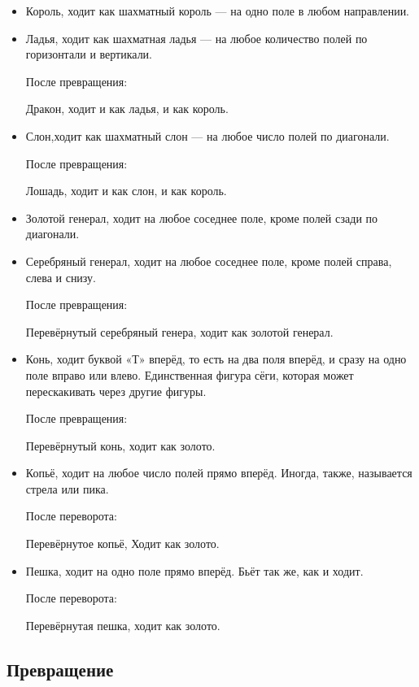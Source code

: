 \begin{itemize}
	\item Король, 
	 ходит как шахматный король — на одно поле в любом направлении.
	 
	\item Ладья, ходит как шахматная ладья — на любое количество полей по горизонтали и 	     вертикали.

	 После превращения:

     Дракон, ходит и как ладья, и как король.

	\item Слон,ходит как шахматный слон — на любое число полей по диагонали.

	 После превращения:

	 Лошадь, ходит и как слон, и как король.

	\item Золотой генерал, ходит на любое соседнее поле, кроме полей сзади по диагонали.

	\item Серебряный генерал, ходит на любое соседнее поле, кроме полей справа, слева и 	 	 снизу.

	 После превращения:

	 Перевёрнутый серебряный генера, ходит как золотой генерал.

	\item Конь, ходит буквой «Т» вперёд, то есть на два поля вперёд, и сразу на одно поле 		 вправо или влево. Единственная фигура сёги, которая может перескакивать через другие 		 фигуры.

	 После превращения:

     Перевёрнутый конь, ходит как золото.

	\item Копьё, ходит на любое число полей прямо вперёд. Иногда, также, называется стрела 	 или пика.

	 После переворота:

	 Перевёрнутое копьё, Ходит как золото.

    \item Пешка, ходит на одно поле прямо вперёд. Бьёт так же, как и ходит.

	 После переворота:

	 Перевёрнутая пешка, ходит как золото.
	
\end{itemize}

\subsection{Превращение}

